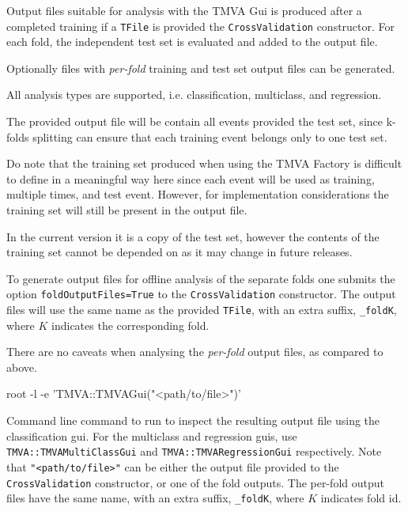 Output files suitable for analysis with the TMVA Gui is produced after a completed training if a \texttt{TFile} is provided the \texttt{CrossValidation} constructor. For each fold, the independent test set is evaluated and added to the output file.

Optionally files with \emph{per-fold} training and test set output files can be generated. 

All analysis types are supported, i.e. classification, multiclass, and regression.

The provided output file will be contain all events provided the test set, since k-folds splitting can ensure that each training event belongs only to one test set.

Do note that the training set produced when using the TMVA Factory is difficult to define in a meaningful way here since each event will be used as training, multiple times, and test event. However, for implementation considerations the training set will still be present in the output file. 

In the current version it is a copy of the test set, however the contents of the training set cannot be depended on as it may change in future releases.

To generate output files for offline analysis of the separate folds one submits the option \texttt{foldOutputFiles=True} to the \texttt{CrossValidation} constructor. The output files will use the same name as the provided \texttt{TFile}, with an extra suffix, \texttt{\_foldK}, where $K$ indicates the corresponding fold.

There are no caveats when analysing the \emph{per-fold} output files, as compared to above.

\begin{codeexample}
\begin{tmvacode}
root -l -e 'TMVA::TMVAGui("<path/to/file>")'
\end{tmvacode}
\caption[.]{\codeexampleCaptionSize Command line command to run to inspect the resulting output file using the classification gui.
For the multiclass and regression guis, use \texttt{TMVA::TMVAMultiClassGui} and \texttt{TMVA::TMVARegressionGui} respectively. Note that \texttt{"<path/to/file>"} can be either the output file provided to the \texttt{CrossValidation} constructor, or one of the fold outputs.
The per-fold output files have the same name, with an extra suffix, \texttt{\_foldK}, where $K$ indicates fold id.}
\label{code:cv-gui}
\end{codeexample}

